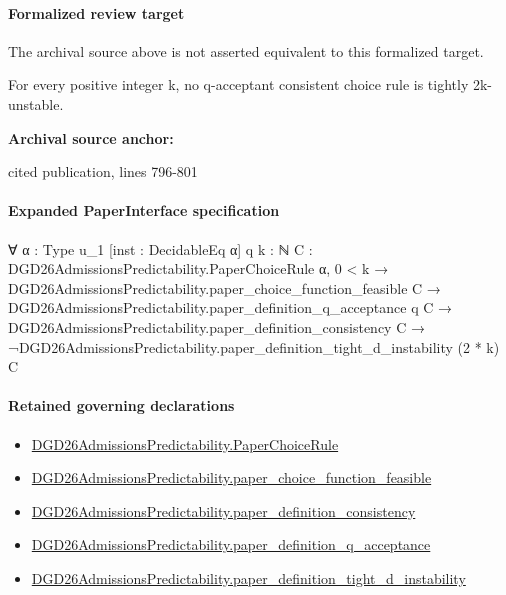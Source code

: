 \documentclass[10pt]{article}
\begin{document}
\paragraph{Formalized review target}
The archival source above is not asserted equivalent to this formalized target.
\begin{ReviewVerbatim}
For every positive integer k, no q-acceptant consistent choice rule is tightly 2k-unstable.
\end{ReviewVerbatim}

\textbf{Archival source anchor:} {\footnotesize\raggedright cited publication, lines 796-\allowbreak{}801\par}
\paragraph{Expanded PaperInterface specification}
\begin{ReviewVerbatim}
∀ {α : Type u_1} [inst : DecidableEq α] {q k : ℕ} {C : DGD26AdmissionsPredictability.PaperChoiceRule α},
  0 < k →
    DGD26AdmissionsPredictability.paper_choice_function_feasible C →
      DGD26AdmissionsPredictability.paper_definition_q_acceptance q C →
        DGD26AdmissionsPredictability.paper_definition_consistency C →
          ¬DGD26AdmissionsPredictability.paper_definition_tight_d_instability (2 * k) C
\end{ReviewVerbatim}

\paragraph{Retained governing declarations}
\begin{itemize}\raggedright
\item \hyperlink{governing-declaration-4678951b4432b184}{DGD26\allowbreak{}Admissions\allowbreak{}Predictability.\allowbreak{}Paper\allowbreak{}Choice\allowbreak{}Rule}
\item \hyperlink{governing-declaration-f7de74a44053f6d5}{DGD26\allowbreak{}Admissions\allowbreak{}Predictability.\allowbreak{}paper\_\allowbreak{}choice\_\allowbreak{}function\_\allowbreak{}feasible}
\item \hyperlink{governing-declaration-2c6907b2b3cc5a08}{DGD26\allowbreak{}Admissions\allowbreak{}Predictability.\allowbreak{}paper\_\allowbreak{}definition\_\allowbreak{}consistency}
\item \hyperlink{governing-declaration-7ecd62274fb2f391}{DGD26\allowbreak{}Admissions\allowbreak{}Predictability.\allowbreak{}paper\_\allowbreak{}definition\_\allowbreak{}q\_\allowbreak{}acceptance}
\item \hyperlink{governing-declaration-f5c221f0a3041f33}{DGD26\allowbreak{}Admissions\allowbreak{}Predictability.\allowbreak{}paper\_\allowbreak{}definition\_\allowbreak{}tight\_\allowbreak{}d\_\allowbreak{}instability}
\end{itemize}
\end{document}
